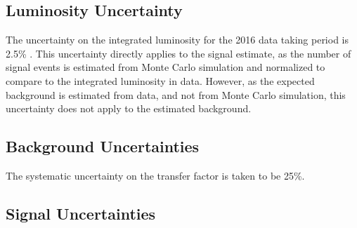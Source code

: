 \subsection{Luminosity Uncertainty}
The uncertainty on the integrated luminosity for the 2016 data taking period is 2.5\% \cite{CMS-PAS-LUM-17-001}.
This uncertainty directly applies to the signal estimate, as the number of signal events is estimated from Monte Carlo simulation and normalized to compare to the integrated luminosity in data.
However, as the expected background is estimated from data, and not from Monte Carlo simulation, this uncertainty does not apply to the estimated background.

\subsection{Background Uncertainties}
\label{sec:dd:bgunc}
The systematic uncertainty on the transfer factor \TF is taken to be 25\%.

\subsection{Signal Uncertainties}
